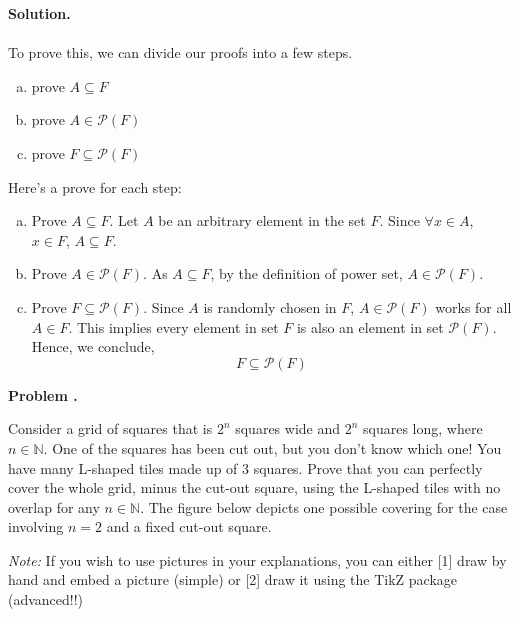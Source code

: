 \documentclass[12pt]{article}
\newcounter{HWcounter}
\newcommand{\problem}{\textbf{Problem  \theHWcounter.} \addtocounter{HWcounter}{1}}
\newcommand{\answer}{\vspace{2em} \textbf{Solution. }}
\newcommand{\N}{\mathbb{N}} %
\begin{document}
\answer  %
\\
\\To prove this, we can divide our proofs into a few steps.
\begin{enumerate}[(a)]
    \item prove $A \subseteq F$
    \item prove $A \in \mathscr{P}(F)$
    \item prove $F \subseteq \mathscr{P}(F)$
\end{enumerate}
Here's a prove for each step:
\begin{enumerate}[(a)]
    \item Prove $A \subseteq F$. Let $A$ be an arbitrary element in the set $F$. Since $\forall x \in A$, $x \in F$, $A \subseteq F$.
    \item Prove $A \in \mathscr{P}(F)$. As $A \subseteq F$, by the definition of power set, $A \in \mathscr{P}(F)$.
    \item Prove $F \subseteq \mathscr{P}(F)$. Since $A$ is randomly chosen in $F$, $A \in \mathscr{P}(F)$ works for all $A \in F$. This implies every element in set $F$ is also an element in set $\mathscr{P}(F)$. Hence, we conclude,
    \[F \subseteq \mathscr{P}(F)\]
\end{enumerate}






\newpage
\problem Consider a grid of squares that is $2^n$ squares wide and $2^n$ squares long, where $n \in \N$. One of the squares has been cut out, but you don't know which one! You have many L-shaped tiles made up of 3 squares. Prove that you can perfectly cover the whole grid, minus the cut-out square, using the L-shaped tiles with no overlap for any $n \in \N$. The figure below depicts one possible covering for the case involving $n=2$ and a fixed cut-out square.

\bigskip

\textit{Note:} If you wish to use pictures in your explanations, you can either [1] draw by hand and embed a picture (simple) or [2] draw it using the TikZ package (advanced!!)

\begin{center}
\end{center}
\end{document}
